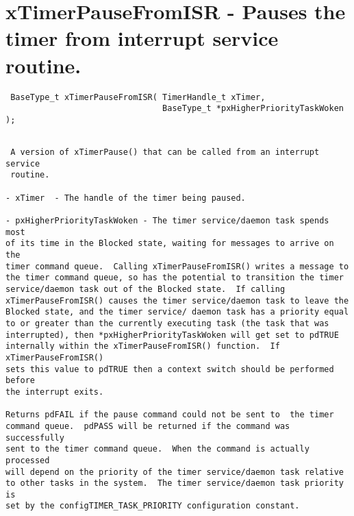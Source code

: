 \section{xTimerPauseFromISR -  Pauses the timer from interrupt service routine.}
\label{rt_cmd:xTimerPauseFromISR}
\begin{verbatim}
 BaseType_t xTimerPauseFromISR( TimerHandle_t xTimer,
                                BaseType_t *pxHigherPriorityTaskWoken );
\end{verbatim}

\begin{lstlisting}

 A version of xTimerPause() that can be called from an interrupt service
 routine.

- xTimer  - The handle of the timer being paused.

- pxHigherPriorityTaskWoken - The timer service/daemon task spends most
of its time in the Blocked state, waiting for messages to arrive on the
timer command queue.  Calling xTimerPauseFromISR() writes a message to
the timer command queue, so has the potential to transition the timer
service/daemon task out of the Blocked state.  If calling
xTimerPauseFromISR() causes the timer service/daemon task to leave the
Blocked state, and the timer service/ daemon task has a priority equal
to or greater than the currently executing task (the task that was
interrupted), then *pxHigherPriorityTaskWoken will get set to pdTRUE
internally within the xTimerPauseFromISR() function.  If xTimerPauseFromISR()
sets this value to pdTRUE then a context switch should be performed before
the interrupt exits.

Returns pdFAIL if the pause command could not be sent to  the timer
command queue.  pdPASS will be returned if the command was successfully
sent to the timer command queue.  When the command is actually processed
will depend on the priority of the timer service/daemon task relative
to other tasks in the system.  The timer service/daemon task priority is
set by the configTIMER_TASK_PRIORITY configuration constant.

\end{lstlisting}
